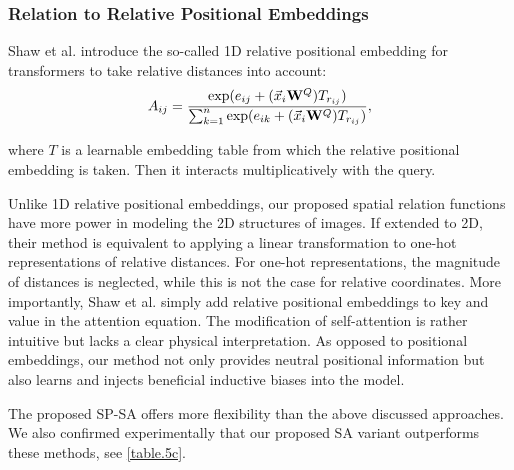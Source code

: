 \documentclass[authorversion, sigconf, acmthm=false, nonacm=true]{acmart}
\begin{document}
\subsubsection{Relation to Relative Positional Embeddings}
Shaw et al. \cite{shaw2018self} introduce the so-called 1D relative positional embedding for transformers to take relative distances into account:
\begin{equation}
A_{ij} = \frac{{\rm exp}(e_{ij}+(\vec{x}_i\mathbf{W}^Q)T_{r_{ij}})} {\sum^n_{k=1} {\rm exp} (e_{ik}+(\vec{x}_i\mathbf{W}^Q)T_{r_{ij}})},
\label{rpe}
\end{equation}

\noindent where $T$ is a learnable embedding table from which the relative positional embedding is taken. Then it interacts multiplicatively with the query.

Unlike 1D relative positional embeddings, our proposed spatial relation functions have more power in modeling the 2D structures of images. 
If extended to 2D, their method is equivalent to applying a linear transformation to one-hot representations of relative distances. 
For one-hot representations, the magnitude of distances is neglected, while this is not the case for relative coordinates.  
More importantly, Shaw et al. \cite{shaw2018self} simply add relative positional embeddings to key and value in the attention equation. The modification of self-attention 
is rather intuitive but lacks a clear physical interpretation. As opposed to positional embeddings,
our method not only provides neutral positional information but also learns and injects beneficial inductive biases into the model. 
 


The proposed SP-SA offers more flexibility than the above discussed approaches. We also confirmed experimentally that our proposed SA variant outperforms these methods, see \cref{table.5c}.
\end{document}
